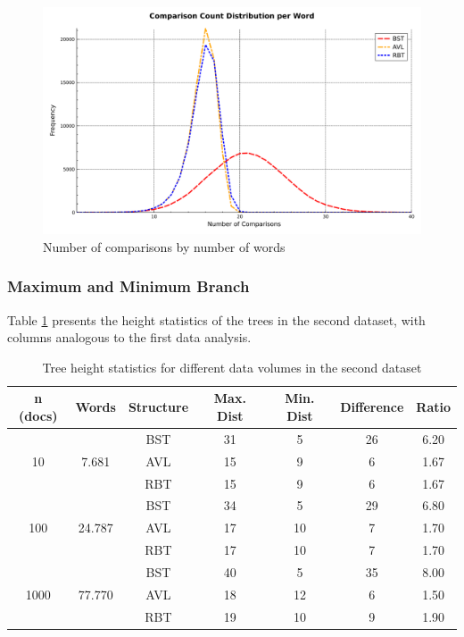  \begin{figure}[H]
     \centering
     \includegraphics[width=0.8\linewidth]{img/Graph_6_77770.pdf}
     \caption{Number of comparisons by number of words}
     \label{fig:comparacoes2}
 \end{figure}

 \subsubsection{Maximum and Minimum Branch}

 Table \ref{tab:altura_db2} presents the height statistics of the trees in the second dataset,
 with columns analogous to the first data analysis.

 \begin{table}[H]
     \centering
     \begin{tabular}{|c|c|c|c|c|c|c|}
     \hline
     \textbf{n (docs)} & \textbf{Words} & \textbf{Structure} & \textbf{Max. Dist} & \textbf{Min. Dist} & \textbf{Difference} & \textbf{Ratio} \\
     \hline
     \multirow{3}{*}{10} & \multirow{3}{*}{7.681} & BST & 31 & 5 & 26 & 6.20 \\
     & & AVL & 15 & 9 & 6 & 1.67 \\
     & & RBT & 15 & 9 & 6 & 1.67 \\
     \hline
     \multirow{3}{*}{100} & \multirow{3}{*}{24.787} & BST & 34 & 5 & 29 & 6.80 \\
     & & AVL & 17 & 10 & 7 & 1.70 \\
     & & RBT & 17 & 10 & 7 & 1.70 \\
     \hline
     \multirow{3}{*}{1000} & \multirow{3}{*}{77.770} & BST & 40 & 5 & 35 & 8.00 \\
     & & AVL & 18 & 12 & 6 & 1.50 \\
     & & RBT & 19 & 10 & 9 & 1.90 \\
     \hline
     \end{tabular}
     \caption{Tree height statistics for different data volumes in the second dataset}
     \label{tab:altura_db2}
 \end{table}

